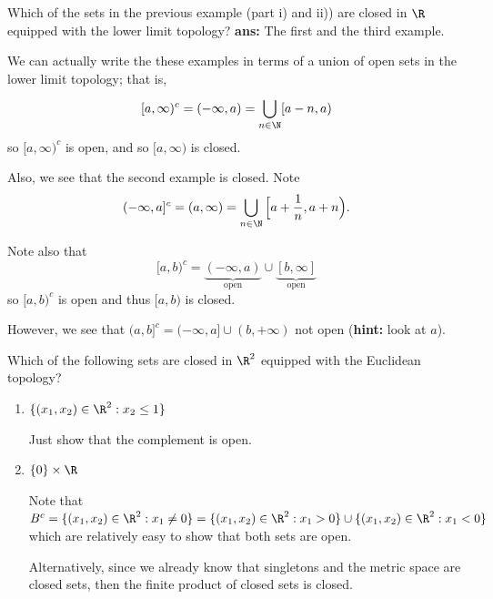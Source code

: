 \begin{problem}
    Which of the sets in the previous example (part i) and ii)) are closed in \( \R  \) equipped with the lower limit topology?
    \textbf{ans:} The first and the third example. 

    We can actually write the these examples in terms of a union of open sets in the lower limit topology; that is, 
    \[  [a,\infty)^{c} = (-\infty , a ) = \bigcup_{ n \in \N  }^{  }  [a-n, a) \]
    so \( [a,\infty)^{c} \) is open, and so \( [a,\infty)   \) is closed.

    Also, we see that the second example is closed. Note 
    \[  (-\infty , a]^{c} = (a,\infty ) = \bigcup_{ n \in \N  }^{  }  \Big[a + \frac{ 1 }{ n }  , a + n \Big).  \]

    Note also that 
    \[  [a,b)^{c} = \underbrace{(-\infty , a )}_{\text{open}} \cup \underbrace{[b,\infty ]}_{\text{open}} \]
    so \( [a,b)^{c} \) is open and thus \( [a,b)  \) is closed.

    However, we see that \( (a,b]^{c} = (-\infty , a] \cup (b,+\infty )   \) not open (\textbf{hint:} look at \( a  \)). 

\end{problem}

\begin{problem}
    Which of the following sets are closed in \( \R^{2} \) equipped with the Euclidean topology?
\end{problem}
\begin{enumerate}
    \item[(i)] \( \{ ({x}_{1}, {x}_{2}) \in \R^{2} : {x}_{2} \leq  1  \}  \)

        Just show that the complement is open.
    \item[(ii)] \( \{ 0  \}  \times \R  \)
        
        Note that \( B^{c} = \{ ({x}_{1}, {x}_{2}) \in \R^{2} : {x}_{1} \neq 0  \}  = \{  ({x}_{1} , {x}_{2}) \in \R^{2} : {x}_{1} > 0  \}  \cup \{ ({x}_{1} , {x}_{2}) \in \R^{2} : {x}_{1} < 0  \}  \) which are relatively easy to show that both sets are open. 

        Alternatively, since we already know that singletons and the metric space are closed sets, then the finite product of closed sets is closed.
\end{enumerate}

